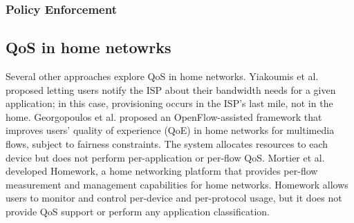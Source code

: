 \subsubsection{Policy Enforcement}

\subsection{QoS in home netowrks}
Several other approaches explore QoS in home networks.
Yiakoumis et al. proposed letting users notify the ISP about
their bandwidth needs for a given application; in this case, provisioning
occurs in the ISP’s last mile, not in the home.
Georgopoulos et al. proposed an OpenFlow-assisted framework
that improves users’ quality of experience (QoE) in
home networks for multimedia flows, subject to fairness constraints. The system allocates resources to each device
but does not perform per-application or per-flow QoS. Mortier
et al. developed Homework, a home networking platform that
provides per-flow measurement and management capabilities
for home networks. Homework allows users to monitor
and control per-device and per-protocol usage, but it does not
provide QoS support or perform any application classification.
